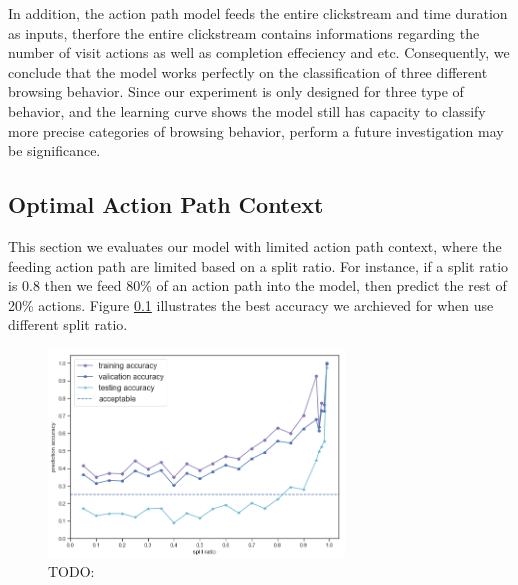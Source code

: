 In addition, the action path model feeds the entire clickstream and time duration as inputs, 
therfore the entire clickstream contains informations regarding the number of visit actions
as well as completion effeciency and etc. Consequently, we conclude that the model works
perfectly on the classification of three different browsing behavior. Since our experiment is
only designed for three type of behavior, and the learning curve
shows the model still has capacity to classify more precise categories of browsing behavior,
perform a future investigation may be significance.

\subsection{Optimal Action Path Context}

This section we evaluates our model with limited action path context, where the feeding action path
are limited based on a split ratio. For instance, if a split ratio is 0.8 then we feed 80\% of 
an action path into the model, then predict the rest of 20\% actions. Figure \ref{} illustrates
the best accuracy we archieved for when use different split ratio.

\begin{figure}[H]
    \centering
    \includegraphics[width=0.7\textwidth]{figures/acc}
    \caption{TODO:}
    \label{fig:acc}
\end{figure}

